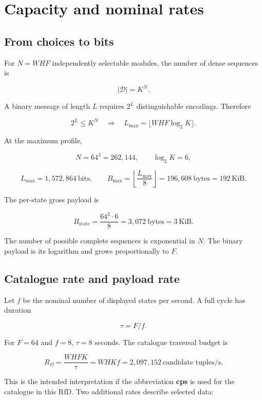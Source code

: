 \documentclass[
  11pt,
  a4paper,
]{article}
\begin{document}
\hypertarget{capacity-and-nominal-rates}{%
\section{Capacity and nominal rates}\label{capacity-and-nominal-rates}}

\hypertarget{from-choices-to-bits}{%
\subsection{From choices to bits}\label{from-choices-to-bits}}

For \(N=WHF\) independently selectable modules, the number of dense
sequences is

\[
|\mathcal D|=K^N.
\]

A binary message of length \(L\) requires \(2^L\) distinguishable
encodings. Therefore

\[
2^L\le K^N
\quad\Longrightarrow\quad
L_{\max}=\lfloor WHF\log_2K\rfloor.
\]

At the maximum profile,

\[
N=64^3=262{,}144,\qquad
\log_2K=6,
\]

\[
L_{\max}=1{,}572{,}864\ \text{bits},
\qquad
B_{\max}=\left\lfloor\frac{L_{\max}}8\right\rfloor
=196{,}608\ \text{bytes}=192\ \text{KiB}.
\]

The per-state gross payload is

\[
B_{\mathrm{state}}=\frac{64^2\cdot6}{8}
=3{,}072\ \text{bytes}=3\ \text{KiB}.
\]

The number of possible complete sequences is exponential in \(N\). The
binary payload is its logarithm and grows proportionally to \(F\).

\hypertarget{catalogue-rate-and-payload-rate}{%
\subsection{Catalogue rate and payload
rate}\label{catalogue-rate-and-payload-rate}}

Let \(f\) be the nominal number of displayed states per second. A full
cycle has duration

\[
\tau=F/f.
\]

For \(F=64\) and \(f=8\), \(\tau=8\) seconds. The catalogue traversal
budget is

\[
R_{\Omega}=\frac{WHFK}{\tau}
=WHKf=2{,}097{,}152
\ \text{candidate tuples/s}.
\]

This is the intended interpretation if the abbreviation \textbf{cps} is
used for the catalogue in this RfD. Two additional rates describe
selected data:
\end{document}
